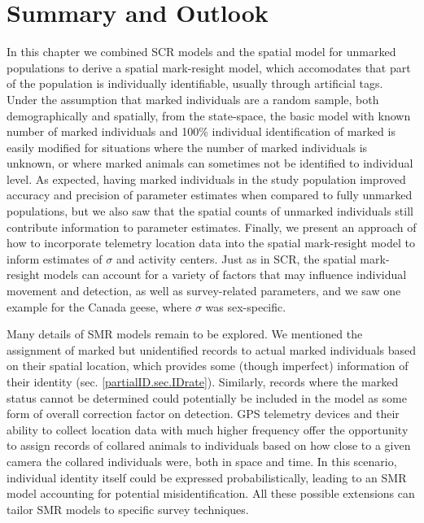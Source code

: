 \section{Summary and Outlook}
In this chapter we combined SCR models and the spatial model for unmarked populations to derive a spatial mark-resight model, which accomodates that part of the population is individually identifiable, usually through artificial tags. Under the assumption that marked individuals are a random sample, both demographically and spatially, from the state-space, the basic model with known number of marked individuals and 100\% individual identification of marked is easily modified for situations where the number of marked individuals is unknown, or where marked animals can sometimes not be identified to individual level. As expected, having marked individuals in the study population improved accuracy and precision of parameter estimates when compared to fully unmarked populations, but we also saw that the spatial counts of unmarked individuals still contribute information to parameter estimates. Finally, 
we present an approach of how to incorporate telemetry location data into the spatial mark-resight model to inform estimates of $\sigma$ and activity centers. Just as in SCR, the spatial mark-resight models
can account for a variety of factors that may influence individual movement and detection, as well as survey-related parameters, and we saw one example for the Canada geese, where $\sigma$ was sex-specific.

Many details of SMR models remain to be explored. We mentioned the assignment of marked but unidentified records to actual marked individuals based on their spatial location, which provides some (though imperfect) information of their identity (sec. \ref{partialID.sec.IDrate}). Similarly, records where the marked status cannot be determined could potentially be included in the model as some form of overall correction factor on detection. GPS telemetry devices and their ability to collect location data with much higher frequency offer the opportunity to assign records of collared animals to individuals based on how close to a given camera the collared individuals were, both in space and time. In this scenario, individual identity itself could be expressed probabilistically, leading to an SMR model accounting for potential misidentification. All these possible extensions can tailor SMR models to specific survey techniques.

